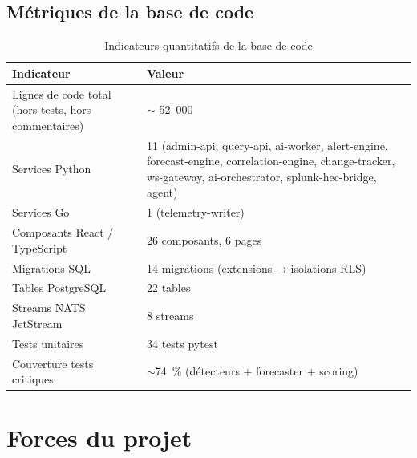 \subsection{Métriques de la base de code}

\begin{table}[H]
\centering
\caption{Indicateurs quantitatifs de la base de code \caimp{}}
\label{tab:codebase-metrics}
\begin{tabularx}{\textwidth}{lX}
\toprule
\textbf{Indicateur} & \textbf{Valeur} \\
\midrule
Lignes de code total (hors tests, hors commentaires)
  & $\sim$ 52~000 \\
Services Python & 11 (admin-api, query-api, ai-worker, alert-engine,
  forecast-engine, correlation-engine, change-tracker, ws-gateway,
  ai-orchestrator, splunk-hec-bridge, agent) \\
Services Go     & 1 (telemetry-writer) \\
Composants React / TypeScript & 26 composants, 6 pages \\
Migrations SQL  & 14 migrations (extensions → isolations RLS) \\
Tables PostgreSQL & 22 tables \\
Streams NATS JetStream & 8 streams \\
Tests unitaires & 34 tests pytest \\
Couverture tests critiques & $\sim$74~\% (détecteurs + forecaster + scoring) \\
\bottomrule
\end{tabularx}
\end{table}

\section{Forces du projet}

